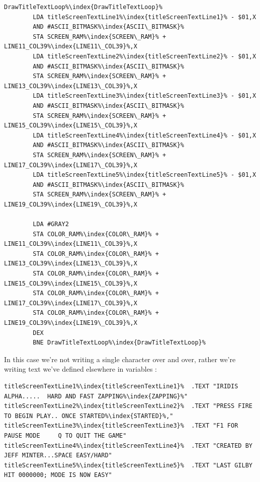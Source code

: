 \begin{lstlisting}[caption=In \icode{DrawTitleScreenText\index{DrawTitleScreenText}},escapechar=\%]
DrawTitleTextLoop%\index{DrawTitleTextLoop}%   
        LDA titleScreenTextLine1%\index{titleScreenTextLine1}% - $01,X
        AND #ASCII_BITMASK%\index{ASCII\_BITMASK}%
        STA SCREEN_RAM%\index{SCREEN\_RAM}% + LINE11_COL39%\index{LINE11\_COL39}%,X
        LDA titleScreenTextLine2%\index{titleScreenTextLine2}% - $01,X
        AND #ASCII_BITMASK%\index{ASCII\_BITMASK}%
        STA SCREEN_RAM%\index{SCREEN\_RAM}% + LINE13_COL39%\index{LINE13\_COL39}%,X
        LDA titleScreenTextLine3%\index{titleScreenTextLine3}% - $01,X
        AND #ASCII_BITMASK%\index{ASCII\_BITMASK}%
        STA SCREEN_RAM%\index{SCREEN\_RAM}% + LINE15_COL39%\index{LINE15\_COL39}%,X
        LDA titleScreenTextLine4%\index{titleScreenTextLine4}% - $01,X
        AND #ASCII_BITMASK%\index{ASCII\_BITMASK}%
        STA SCREEN_RAM%\index{SCREEN\_RAM}% + LINE17_COL39%\index{LINE17\_COL39}%,X
        LDA titleScreenTextLine5%\index{titleScreenTextLine5}% - $01,X
        AND #ASCII_BITMASK%\index{ASCII\_BITMASK}%
        STA SCREEN_RAM%\index{SCREEN\_RAM}% + LINE19_COL39%\index{LINE19\_COL39}%,X

        LDA #GRAY2
        STA COLOR_RAM%\index{COLOR\_RAM}% + LINE11_COL39%\index{LINE11\_COL39}%,X
        STA COLOR_RAM%\index{COLOR\_RAM}% + LINE13_COL39%\index{LINE13\_COL39}%,X
        STA COLOR_RAM%\index{COLOR\_RAM}% + LINE15_COL39%\index{LINE15\_COL39}%,X
        STA COLOR_RAM%\index{COLOR\_RAM}% + LINE17_COL39%\index{LINE17\_COL39}%,X
        STA COLOR_RAM%\index{COLOR\_RAM}% + LINE19_COL39%\index{LINE19\_COL39}%,X
        DEX
        BNE DrawTitleTextLoop%\index{DrawTitleTextLoop}%
\end{lstlisting}

In this case we're not writing a single character over and over, rather we're writing text we've defined elsewhere
in variables :

\begin{lstlisting}[caption=In \icode{DrawTitleScreenText\index{DrawTitleScreenText}},escapechar=\%]
titleScreenTextLine1%\index{titleScreenTextLine1}%  .TEXT "IRIDIS ALPHA.....  HARD AND FAST ZAPPING%\index{ZAPPING}%"
titleScreenTextLine2%\index{titleScreenTextLine2}%  .TEXT "PRESS FIRE TO BEGIN PLAY.. ONCE STARTED%\index{STARTED}%,"
titleScreenTextLine3%\index{titleScreenTextLine3}%  .TEXT "F1 FOR PAUSE MODE     Q TO QUIT THE GAME"
titleScreenTextLine4%\index{titleScreenTextLine4}%  .TEXT "CREATED BY JEFF MINTER...SPACE EASY/HARD"
titleScreenTextLine5%\index{titleScreenTextLine5}%  .TEXT "LAST GILBY HIT 0000000; MODE IS NOW EASY"
\end{lstlisting}

